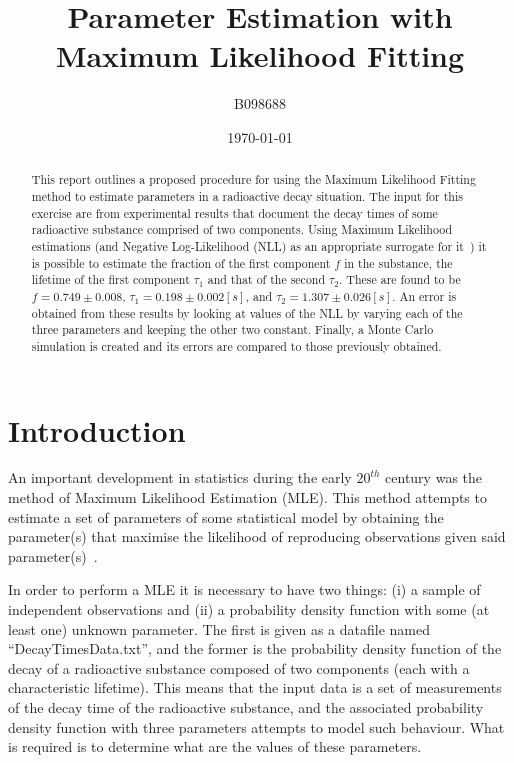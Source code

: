 \documentclass[a4paper,12pt]{article}
\title{Parameter Estimation with Maximum Likelihood Fitting}
\author{B098688}
\date{\today}
\begin{document}
\maketitle

\begin{abstract}
 This report outlines a proposed procedure for using the Maximum Likelihood Fitting method to estimate parameters in a radioactive decay situation. The input for this exercise are from experimental results that document the decay times of some radioactive substance comprised of two components. Using Maximum Likelihood estimations (and Negative Log-Likelihood (NLL) as an appropriate surrogate for it~\cite{erdogan1999monotonic}) it is possible to estimate the fraction of the first component $f$ in the substance, the lifetime of the first component $\tau_1$ and that of the second $\tau_2$. These are found to be $f=0.749 \pm 0.008$, $\tau_1=0.198 \pm 0.002 [s]$, and $\tau_2=1.307 \pm 0.026 [s]$. An error is obtained from these results by looking at values of the NLL by varying each of the three parameters and keeping the other two constant. Finally, a Monte Carlo simulation is created and its errors are compared to those previously obtained. 
\end{abstract}

\section{Introduction}

An important development in statistics during the early $20^{th}$ century was the method of Maximum Likelihood Estimation (MLE). This method attempts to estimate a set of parameters of some statistical model by obtaining the parameter(s) that maximise the likelihood of reproducing observations given said parameter(s)~\cite{aldrich1997ra}. 

In order to perform a MLE it is necessary to have two things: (i) a sample of independent observations and (ii) a probability density function with some (at least one) unknown parameter. The first is given as a datafile named ``DecayTimesData.txt'', and the former is the probability density function of the decay of a radioactive substance composed of two components (each with a characteristic lifetime). This means that the input data is a set of measurements of the decay time of the radioactive substance, and the associated probability density function with three parameters attempts to model such behaviour. What is required is to determine what are the values of these parameters.
\end{document}
